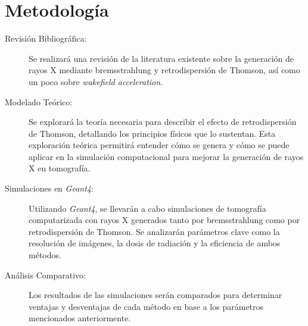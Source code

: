\vspace*{\fill}

\section{Metodología}


\begin{description}
    \item[Revisión Bibliográfica: ] Se realizará una revisión de la literatura existente sobre la generación de rayos X mediante bremsstrahlung y retrodispersión de Thomson, así como un poco sobre \textit{wakefield acceleration}.
    \item[Modelado Teórico: ] Se explorará la teoría necesaria para describir el efecto de retrodispersión de Thomson, detallando los principios físicos que lo sustentan. Esta exploración teórica permitirá entender cómo se genera y cómo se puede aplicar en la simulación computacional para mejorar la generación de rayos X en tomografía.
    \item[Simulaciones en \textit{Geant4}: ] Utilizando \textit{Geant4}, se llevarán a cabo simulaciones de tomografía computarizada con rayos X generados tanto por bremsstrahlung como por retrodispersión de Thomson. Se analizarán parámetros clave como la resolución de imágenes, la dosis de radiación y la eficiencia de ambos métodos.
    \item[Análisis Comparativo: ] Los resultados de las simulaciones serán comparados para determinar ventajas y desventajas de cada método en base a los parámetros mencionados anteriormente.
\end{description}


\vspace*{\fill}